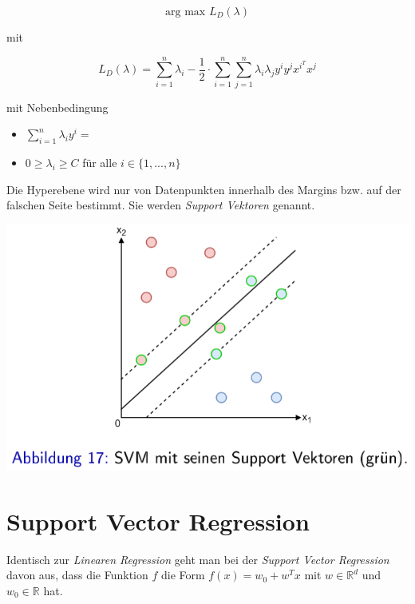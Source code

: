 \documentclass{report}
\begin{document}
  $$\text{arg max }L_D(\lambda)$$	
  
  mit	
  
  $$L_D(\lambda) = \sum_{i=1}^n\lambda_i -\frac{1}{2}\cdot\sum_{i=1}^n\sum_{j=1}^n\lambda_i\lambda_jy^iy^jx^{i^T}x^j$$	
  
  mit Nebenbedingung\\	
  \vspace*{-1.5em}	
  \begin{itemize}	
    \item $\sum_{i=1}^n\lambda_iy^i = $	
    \item $0\geq \lambda_i\geq C$ für alle $i\in \{1, ..., n\}$	
  \end{itemize}	
  
  Die Hyperebene wird nur von Datenpunkten innerhalb des Margins bzw. auf der falschen Seite bestimmt.	
  Sie werden \textit{Support Vektoren} genannt.	
  
  \begin{center}	
    \includegraphics[scale=.275]{ml06_17}	
  \end{center}	
  
  \section{Support Vector Regression}	
  
  Identisch zur \textit{Linearen Regression} geht man bei der \textit{Support Vector Regression} davon aus,	
  dass die Funktion $f$ die Form $f(x) = w_0 + w^Tx$ mit $w\in \mathbb{R}^d$ und $w_0\in \mathbb{R}$ hat.	
  
\end{document}

